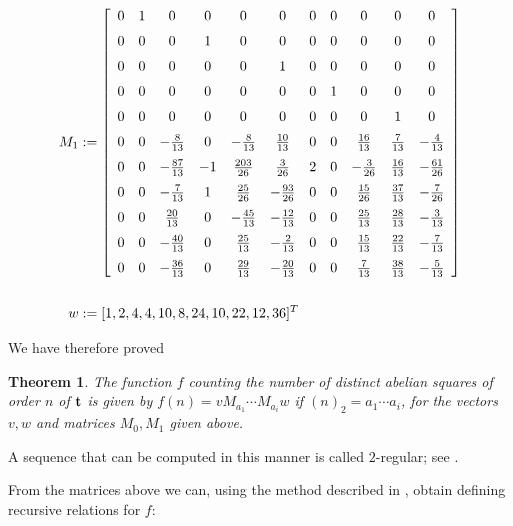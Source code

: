 \documentclass[11pt,reqno]{amsart}
\numberwithin{equation}{section}
\theoremstyle{plain}
\newtheorem{theorem}{Theorem}
\theoremstyle{definition}
\theoremstyle{remark}
\begin{document}
\begin{align*}
M_1 & := \left[ \begin {array}{ccccccccccc} 0&1&0&0&0&0&0&0&0&0&0\\ \noalign{\medskip}0&0&0&
1&0&0&0&0&0&0&0\\ \noalign{\medskip}0&0&0&0&0&1&0&0&0&0&0\\ \noalign{\medskip}0&0&0&0
&0&0&0&1&0&0&0\\ \noalign{\medskip}0&0&0&0&0&0&0&0&0&1&0\\ \noalign{\medskip}0&0&-{
\frac {8}{13}}&0&-{\frac {8}{13}}&{\frac {10}{13}}&0&0&{\frac {16}{13}}&{\frac {7}{
13}}&-{\frac {4}{13}}\\ \noalign{\medskip}0&0&-{\frac {87}{13}}&-1&{\frac {203}{26}}
&{\frac {3}{26}}&2&0&-{\frac {3}{26}}&{\frac {16}{13}}&-{\frac {61}{26}}
\\ \noalign{\medskip}0&0&-{\frac {7}{13}}&1&{\frac {25}{26}}&-{\frac {93}{26}}&0&0&{
\frac {15}{26}}&{\frac {37}{13}}&-{\frac {7}{26}}\\ \noalign{\medskip}0&0&{\frac {20
}{13}}&0&-{\frac {45}{13}}&-{\frac {12}{13}}&0&0&{\frac {25}{13}}&{\frac {28}{13}}&-
{3\over{13}}\\ \noalign{\medskip}0&0&-{\frac {40}{13}}&0&{\frac {25}{13}}&-{2\over{13}}&0&0&{\frac {
15}{13}}&{\frac {22}{13}}&-{\frac {7}{13}}\\ \noalign{\medskip}0&0&-{\frac {36}{13}}
&0&{\frac {29}{13}}&-{\frac {20}{13}}&0&0&{\frac {7}{13}}&{\frac {38}{13}}&-{\frac {
5}{13}}\end {array} \right]  \\
\ \\
w & := [1,2,4,4,10,8,24,10,22,12,36]^T
\end{align*}

We have therefore proved

\begin{theorem}
The function $f$ counting the number of distinct
abelian squares of order $n$
of $\bf t$ is given by 
$f(n) = v M_{a_1} \cdots M_{a_i} w $
if $(n)_2 = a_1 \cdots a_i$, for the vectors $v,w$ and matrices
$M_0, M_1$ given above.
\end{theorem}
A sequence that can be computed in this manner is called $2$-regular;
see \cite{Allouche&Shallit:1992}.

From the matrices above we can, using the method described in
\cite{Goc&Mousavi&Shallit:2013}, obtain defining recursive relations
for $f$:
\end{document}
